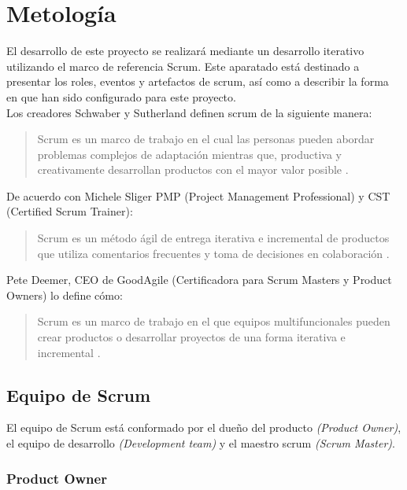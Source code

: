 \section{Metología}

 El desarrollo de este proyecto se realizará mediante un desarrollo iterativo
 utilizando el marco de referencia Scrum. Este aparatado está destinado a
 presentar los roles, eventos y artefactos de scrum, así como a describir
 la forma en que han sido configurado para este proyecto.\\

    \noindent Los creadores Schwaber y Sutherland definen scrum de la siguiente manera:
        \begin{quote}
        Scrum es un marco de trabajo en el cual las personas pueden abordar
        problemas complejos de adaptación mientras que, productiva y creativamente
        desarrollan productos con el mayor valor posible \cite{TheScrumGuide}.
        \end{quote}

    \noindent De acuerdo con Michele Sliger PMP (Project Management Professional) y CST (Certified Scrum Trainer):
        \begin{quote}
        Scrum es un método ágil de entrega iterativa e incremental de productos que
        utiliza comentarios frecuentes y toma de decisiones en colaboración \cite{Sliger1}.
        \end{quote}

    \noindent Pete Deemer, CEO de GoodAgile (Certificadora para Scrum Masters y Product Owners) lo define cómo:%
        \begin{quote}
        Scrum es un marco de trabajo en el que equipos multifuncionales pueden crear productos
        o desarrollar proyectos de una forma iterativa e incremental \cite{ScrumPrimer}.
        \end{quote}


\subsection{Equipo de Scrum}

 \noindent El equipo de Scrum está conformado por el dueño del producto {\em(Product Owner)},
 el equipo de desarrollo {\em(Development team)} y el maestro scrum {\em(Scrum Master)}.

\subsubsection{Product Owner} 

